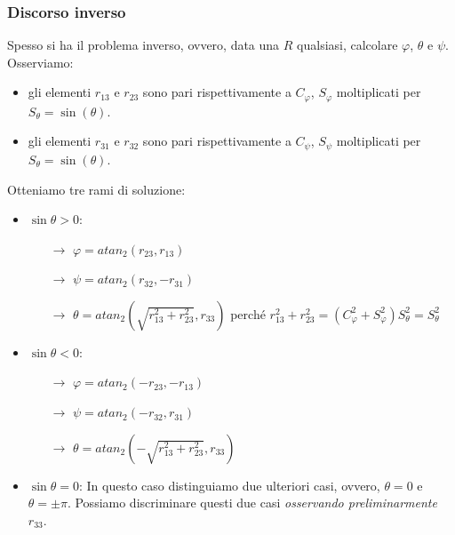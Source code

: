 \subsubsection{Discorso inverso}
Spesso si ha il problema inverso, ovvero, data una $R$ qualsiasi, calcolare $\varphi$, $\theta$ e $\psi$. Osserviamo: 
\begin{itemize}
	\item gli elementi $r_{13}$ e $r_{23}$ sono pari rispettivamente a $C_{\varphi}$, $S_{\varphi}$ moltiplicati per $S_{\theta} = \sin(\theta)$.
	\item gli elementi $r_{31}$ e $r_{32}$ sono pari rispettivamente a $C_{\psi}$, $S_{\psi}$ moltiplicati per $S_{\theta} = \sin(\theta)$. 
\end{itemize}
\newpage
Otteniamo tre rami di soluzione:
\begin{itemize}
	\item $\sin{\theta} > 0$:
	\begin{itemize}
		\item[$\rightarrow$] $\varphi = atan_2(r_{23}, r_{13})$
		\item[$\rightarrow$] $\psi = atan_2(r_{32}, -r_{31})$
		\item[$\rightarrow$] $\theta = atan_2(\sqrt{r_{13}^2 + r_{23}^2}, r_{33})$ perché $r_{13}^2 + r_{23}^2 = (C_{\varphi}^2 + S_{\varphi}^2)S_{\theta}^2 = S_{\theta}^2$
	\end{itemize}
	\item $\sin{\theta} < 0$:
	\begin{itemize}
		\item[$\rightarrow$] $\varphi = atan_2(-r_{23}, -r_{13})$
		\item[$\rightarrow$] $\psi = atan_2(-r_{32}, r_{31})$
		\item[$\rightarrow$] $\theta = atan_2(-\sqrt{r_{13}^2 + r_{23}^2}, r_{33})$
	\end{itemize}
	\item $\sin{\theta} = 0$: In questo caso distinguiamo due ulteriori casi, ovvero, $\theta = 0$ e $\theta = \pm \pi$. Possiamo discriminare questi due casi \emph{osservando preliminarmente} $r_{33}$.
\end{itemize}
